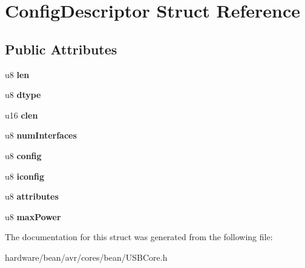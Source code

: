 \hypertarget{struct_config_descriptor}{}\section{Config\+Descriptor Struct Reference}
\label{struct_config_descriptor}
\subsection*{Public Attributes}
\begin{DoxyCompactItemize}
\item 
\hypertarget{struct_config_descriptor_a968a7572b9ec082027df4c3073bbb007}{}u8 {\bfseries len}\label{struct_config_descriptor_a968a7572b9ec082027df4c3073bbb007}

\item 
\hypertarget{struct_config_descriptor_a10c5492972bee3958b7fcef106e8c8e6}{}u8 {\bfseries dtype}\label{struct_config_descriptor_a10c5492972bee3958b7fcef106e8c8e6}

\item 
\hypertarget{struct_config_descriptor_aa295480237f3592398e1d211bedd6c93}{}u16 {\bfseries clen}\label{struct_config_descriptor_aa295480237f3592398e1d211bedd6c93}

\item 
\hypertarget{struct_config_descriptor_ab133b834940700d3f2d17400c5712135}{}u8 {\bfseries num\+Interfaces}\label{struct_config_descriptor_ab133b834940700d3f2d17400c5712135}

\item 
\hypertarget{struct_config_descriptor_ab6fb9cd72dd5c9454270ab6f03a8a66c}{}u8 {\bfseries config}\label{struct_config_descriptor_ab6fb9cd72dd5c9454270ab6f03a8a66c}

\item 
\hypertarget{struct_config_descriptor_a63c87c8909504dfe26da0fe1f91f695f}{}u8 {\bfseries iconfig}\label{struct_config_descriptor_a63c87c8909504dfe26da0fe1f91f695f}

\item 
\hypertarget{struct_config_descriptor_a24699f679e0f0d600a573a1a3c9d4cd5}{}u8 {\bfseries attributes}\label{struct_config_descriptor_a24699f679e0f0d600a573a1a3c9d4cd5}

\item 
\hypertarget{struct_config_descriptor_a4f157a740d4f9c608d0ef137695aad70}{}u8 {\bfseries max\+Power}\label{struct_config_descriptor_a4f157a740d4f9c608d0ef137695aad70}

\end{DoxyCompactItemize}


The documentation for this struct was generated from the following file\+:\begin{DoxyCompactItemize}
\item 
hardware/bean/avr/cores/bean/U\+S\+B\+Core.\+h\end{DoxyCompactItemize}
